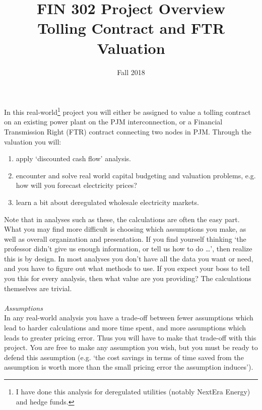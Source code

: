 \documentclass{article}
\title{FIN 302 Project Overview\\
Tolling Contract and FTR Valuation }
\date{Fall 2018}
\begin{document}
\maketitle
\noindent In this real-world\footnote{I have done this analysis for deregulated utilities (notably NextEra Energy) and hedge funds.} project you will either be assigned to value a tolling contract on an existing power plant on the PJM interconnection, or a Financial Transmission Right (FTR) contract connecting two nodes in PJM.  Through the valuation you will:
\begin{enumerate}
\item apply `discounted cash flow' analysis.
\item encounter and solve real world capital budgeting and valuation problems, e.g. how will you forecast electricity prices?
\item learn a bit about deregulated wholesale electricity markets.  
\end{enumerate}
Note that in analyses such as these, the calculations are often the easy part.  What you may find more difficult is choosing which assumptions you make, as well as overall organization and presentation.  If you find yourself thinking `the professor didn't give us enough information, or tell us how to do \dots ',  then realize this is by design.  In most analyses you don't have all the data you want or need, and you have to figure out what methods to use.  If you expect your boss to tell you this for every analysis, then what value are you providing?  The calculations themselves are trivial.\\
\\
{\it Assumptions}\\
In any real-world analysis you have a trade-off between fewer assumptions which lead to harder calculations and more time spent, and more assumptions which leads to greater pricing error.  Thus you will have to make that trade-off with this project.  You are free to make any assumption you wish, but you must be ready to defend this assumption (e.g. `the cost savings in terms of time saved from the assumption is worth more than the small pricing error the assumption induces').      \\
\end{document}
